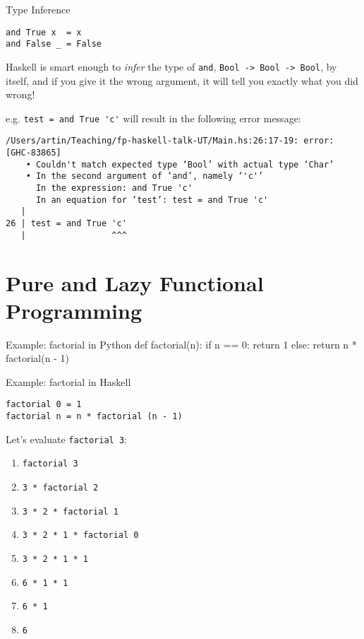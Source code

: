 \documentclass[pdf]{beamer}
\begin{document}
\begin{frame}[fragile]{Type Inference}
\begin{verbatim}
and True x  = x
and False _ = False
\end{verbatim}

  Haskell is smart enough to \textit{infer} the type of \verb|and|, \verb|Bool -> Bool -> Bool|, by itself, and if you give it the wrong argument, it will tell you exactly what you did wrong!

  e.g. \verb|test = and True 'c'| will result in the following error message:

\begin{verbatim}
/Users/artin/Teaching/fp-haskell-talk-UT/Main.hs:26:17-19: error: [GHC-83865]
    • Couldn't match expected type ‘Bool’ with actual type ‘Char’
    • In the second argument of ‘and’, namely ‘'c'’
      In the expression: and True 'c'
      In an equation for ‘test’: test = and True 'c'
   |
26 | test = and True 'c'
   |                 ^^^
\end{verbatim}

\end{frame}

\section{Pure and Lazy Functional Programming}
\label{sec:pure-lazy-fp}

\begin{frame}[fragile]{Example: factorial in Python}
  def factorial(n):
    if n == 0:
        return 1
    else:
        return n * factorial(n - 1)
\end{frame}

\begin{frame}[fragile]{Example: factorial in Haskell}

\begin{verbatim}
factorial 0 = 1
factorial n = n * factorial (n - 1)
\end{verbatim}

  \pause
  Let's evaluate \verb|factorial 3|:

  \begin{enumerate}
    \item<1-> \verb|factorial 3|
    \item<2-> \verb|3 * factorial 2|
    \item<3-> \verb|3 * 2 * factorial 1|
    \item<4-> \verb|3 * 2 * 1 * factorial 0|
    \item<5-> \verb|3 * 2 * 1 * 1|
    \item<6-> \verb|6 * 1 * 1|
    \item<7-> \verb|6 * 1|
    \item<8-> \verb|6|
  \end{enumerate}

\end{frame}
\end{document}

